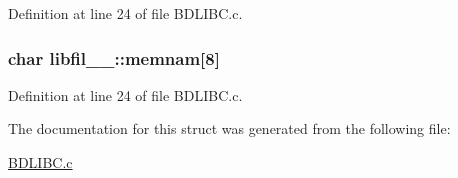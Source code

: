 Definition at line 24 of file B\+D\+L\+I\+B\+C.\+c.

\subsubsection[{\texorpdfstring{memnam}{memnam}}]{\setlength{\rightskip}{0pt plus 5cm}char libfil\+\_\+\_\+\+::memnam\mbox{[}8\mbox{]}}\hypertarget{structlibfil__1___afaf3ccb11f0e1f5ee4ed34fefe5b740b}{}\label{structlibfil__1___afaf3ccb11f0e1f5ee4ed34fefe5b740b}


Definition at line 24 of file B\+D\+L\+I\+B\+C.\+c.



The documentation for this struct was generated from the following file\+:\begin{DoxyCompactItemize}
\item 
\hyperlink{BDLIBC_8c}{B\+D\+L\+I\+B\+C.\+c}\end{DoxyCompactItemize}
